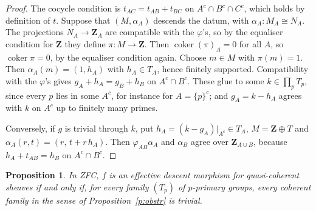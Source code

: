 \documentclass[11pt,a4paper]{amsart}
\newtheorem{proposition}[theorem]{Proposition}
\theoremstyle{definition}
\theoremstyle{remark}
\newcommand{\Z}{\mathbf Z}
\begin{document}
\begin{proof}
The cocycle condition is $t_{AC}=t_{AB}+t_{BC}$ on $A^c\cap B^c\cap C^c$, which holds by definition of $t$. Suppose that $(M,\alpha_A)$ descends the datum, with $\alpha_A\colon M_A\cong N_A$. The projections $N_A\to\Z_A$ are compatible with the $\varphi$'s, so by the equaliser condition \cite[0EUF]{stacks} for $\Z$ they define $\pi\colon M\to\Z$. Then $\operatorname{coker}(\pi)_A=0$ for all $A$, so $\operatorname{coker}\pi=0$, by the equaliser condition again. Choose $m\in M$ with $\pi(m)=1$. Then $\alpha_A(m)=(1,h_A)$ with $h_A\in T_A$, hence finitely supported. Compatibility with the $\varphi$'s gives $g_A+h_A=g_B+h_B$ on $A^c\cap B^c$. These glue to some $k\in\prod_pT_p$, since every $p$ lies in some $A^c$, for instance for $A=\{p\}^c$; and $g_A=k-h_A$ agrees with $k$ on $A^c$ up to finitely many primes.

Conversely, if $g$ is trivial through $k$, put $h_A=(k-g_A)|_{A^c}\in T_A$, $M=\Z\oplus T$ and $\alpha_A(r,t)=(r,\,t+r\,h_A)$. Then $\varphi_{AB}\alpha_A$ and $\alpha_B$ agree over $\Z_{A\cup B}$, because $h_A+t_{AB}=h_B$ on $A^c\cap B^c$.
\end{proof}

\begin{proposition}\label{p:dev}
In ZFC, $f$ is an effective descent morphism for quasi-coherent sheaves if and only if, for every family $(T_p)$ of $p$-primary groups, every coherent family in the sense of Proposition~\ref{p:obstr} is trivial.
\end{proposition}
\end{document}
